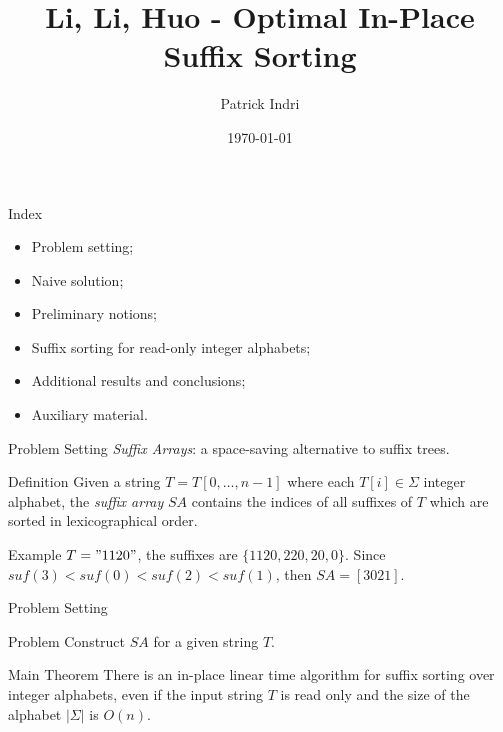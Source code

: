 \documentclass{beamer}
\title{Li, Li, Huo - Optimal In-Place Suffix Sorting}
\date{\today}
\author{Patrick Indri}
\institute{DSSC - Algorithmic Design Exam}
\begin{document}
  \maketitle

  \begin{frame}{Index}
    \begin{itemize}
      \item Problem setting;
      \item Naive solution;
      \item Preliminary notions;
      \item Suffix sorting for read-only integer alphabets;
      \item Additional results and conclusions;
      \item Auxiliary material.
    \end{itemize}
  \end{frame}

  \begin{frame}{Problem Setting}
    \textit{Suffix Arrays}: a space-saving alternative to suffix trees.
    \begin{block}{Definition}
      \vspace{1pt}
      Given a string $T = T[0, \dots, n-1]$ where each $T[i] \in \Sigma$ integer alphabet, the \textit{suffix array} $SA$ contains the indices of all suffixes of $T$ which are sorted in lexicographical order.
    \end{block}
    \pause
    \begin{block}{Example}
      \vspace{1pt}
      $T = "1120"$, the suffixes are $\{ 1120, 220, 20, 0 \}$. Since $suf(3)<suf(0)<suf(2)<suf(1)$, then $SA = [3021]$.
    \end{block}
  \end{frame}

  \begin{frame}{Problem Setting}
    \begin{block}{Problem}
      \vspace{1pt}
      Construct $SA$ for a given string $T$.
    \end{block}
    \begin{block}{Main Theorem}
      \vspace{1pt}
      There is an in-place linear time algorithm for suffix sorting over integer alphabets, even if the input string $T$ is read only and the size of the alphabet $|\Sigma|$ is $O(n)$.
    \end{block}
  \end{frame}
\end{document}

